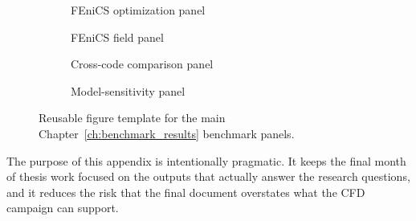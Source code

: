 \begin{figure}[htbp]
	\centering
	\begin{subfigure}[b]{0.48\textwidth}
		\centering
		\caption{FEniCS optimization panel}
	\end{subfigure}
	\hfill
	\begin{subfigure}[b]{0.48\textwidth}
		\centering
		\caption{FEniCS field panel}
	\end{subfigure}

	\vspace{0.5cm}

	\begin{subfigure}[b]{0.48\textwidth}
		\centering
		\caption{Cross-code comparison panel}
	\end{subfigure}
	\hfill
	\begin{subfigure}[b]{0.48\textwidth}
		\centering
		\caption{Model-sensitivity panel}
	\end{subfigure}
	\caption{Reusable figure template for the main Chapter~\ref{ch:benchmark_results} benchmark panels.}
	\label{fig:app_result_template}
\end{figure}

The purpose of this appendix is intentionally pragmatic. It keeps the final month of thesis work focused on the outputs that actually answer the research questions, and it reduces the risk that the final document overstates what the CFD campaign can support.
